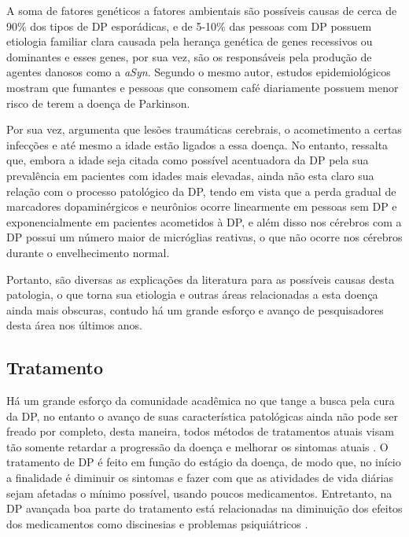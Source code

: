 \documentclass[
	12pt,				%
	openany,			%
	oneside,			%
	a4paper,			%
	english,			%
	french,				%
	spanish,			%
	brazil				%
	]{abntex2}
\begin{document}
A soma de fatores genéticos a fatores ambientais são possíveis causas de cerca de 90\% dos tipos de DP esporádicas, e de 5-10\% das pessoas com DP possuem etiologia familiar clara causada pela herança genética de genes recessivos ou dominantes e esses genes, por sua vez, são os responsáveis pela produção de agentes danosos como a \textit{aSyn}\cite{rana2011}. Segundo o mesmo autor, estudos epidemiológicos mostram que fumantes e pessoas que consomem café diariamente possuem menor risco de terem a doença de Parkinson.	

Por sua vez,  argumenta que lesões traumáticas cerebrais, o acometimento a certas infecções e até mesmo a idade estão ligados a essa doença. No entanto,  ressalta que, embora a idade seja citada como possível acentuadora da DP pela sua prevalência em pacientes com idades mais elevadas, ainda não esta claro sua relação com o processo patológico da DP, tendo em vista que a perda gradual de marcadores dopaminérgicos e neurônios ocorre linearmente em pessoas sem DP e exponencialmente em pacientes acometidos à DP, e além disso nos cérebros com a DP possui um número maior de micróglias reativas, o que não ocorre nos cérebros durante o envelhecimento normal.

Portanto, são diversas as explicações da literatura para as possíveis causas desta patologia, o que torna sua etiologia e outras áreas relacionadas a esta doença ainda mais obscuras, contudo há um grande esforço e avanço de pesquisadores desta área nos últimos anos.


\subsection{Tratamento}

Há um grande esforço da comunidade acadêmica no que tange a busca pela cura da DP, no entanto o avanço de suas característica patológicas ainda não pode ser freado por completo, desta maneira, todos métodos de tratamentos atuais visam tão somente retardar a progressão da doença e melhorar os sintomas atuais \cite{saito2011, yadav2015, levine2003}. O tratamento de DP é feito em função do estágio da doença, de modo que, no início a finalidade é diminuir os sintomas e fazer com que as atividades de vida diárias sejam afetadas o mínimo possível, usando poucos medicamentos. Entretanto, na DP avançada boa parte do tratamento está relacionadas na diminuição dos efeitos dos medicamentos como discinesias e problemas psiquiátricos \cite{levine2003}.
\end{document}
